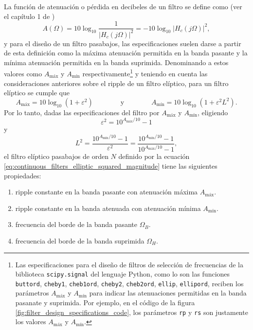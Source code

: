 \documentclass[a4paper]{report}
\begin{document}
La función de atenuación o pérdida en decibeles de un filtro se define como (ver el capítulo 1 de \cite{daniels1974approximation})
\[
 A(\Omega)=10\log_{10}\frac{1}{|H_c(j\Omega)|^2}=-10\log_{10}|H_c(j\Omega)|^2,
\]
y para el diseño de un filtro pasabajos, las especificaciones suelen darse a partir de esta definición como la máxima atenuación permitida en la banda pasante y la mínima atenuación permitida en la banda suprimida. Denominando a estos valores como \(A_\textrm{máx}\) y \(A_\textrm{mín}\) respectivamente\footnote{Las especificaciones para el diseño de filtros de selección de frecuencias de la biblioteca \texttt{scipy.signal} del lenguaje Python, como lo son las funciones \texttt{buttord}, \texttt{cheby1}, \texttt{cheb1ord}, \texttt{cheby2}, \texttt{cheb2ord}, \texttt{ellip}, \texttt{ellipord}, reciben los parámetros \(A_\textrm{máx}\) y \(A_\textrm{mín}\) para indicar las atenuaciones permitidas en la banda pasanate y suprimida. Por ejemplo, en el código de la figura \ref{fig:filter_design_specifications_code}, los parámetros \texttt{rp} y \texttt{rs} son justamente los valores \(A_\textrm{máx}\) y \(A_\textrm{mín}\).} y teniendo en cuenta las consideraciones anteriores sobre el ripple de un filtro elíptico, para un filtro elíptico se cumple que
\[
 A_\textrm{máx}=10\log_{10}(1+\varepsilon^2)
 \qquad\qquad\textrm{y}\qquad\qquad
 A_\textrm{mín}=10\log_{10}(1+\varepsilon^2L^2).
\]
Por lo tanto, dadas las especificaciones del filtro por \(A_\textrm{máx}\) y \(A_\textrm{mín}\), eligiendo
\begin{equation}\label{eq:continuous_filters_elliptic_epsilon}
 \varepsilon^2=10^{A_\textrm{máx}/10}-1 
\end{equation}
y
\begin{equation}\label{eq:continuous_filters_elliptic_L}
 L^2=\frac{10^{A_\textrm{mín}/10}-1}{\varepsilon^2}=\frac{10^{A_\textrm{mín}/10}-1}{10^{A_\textrm{máx}/10}-1}, 
\end{equation}
el filtro elíptico pasabajos de orden \(N\) definido por la ecuación \ref{eq:continuous_filters_elliptic_squared_magnitude} tiene las siguientes propiedades:
\begin{enumerate}
 \item ripple constante en la banda pasante con atenuación máxima \(A_\textrm{máx}\).
 \item ripple constante en la banda atenuada con atenuación mínima \(A_\textrm{mín}\).
 \item frecuencia del borde de la banda pasante \(\Omega_B\).
 \item frecuencia del borde de la banda suprimida \(\Omega_H\).
\end{enumerate}
\end{document}
